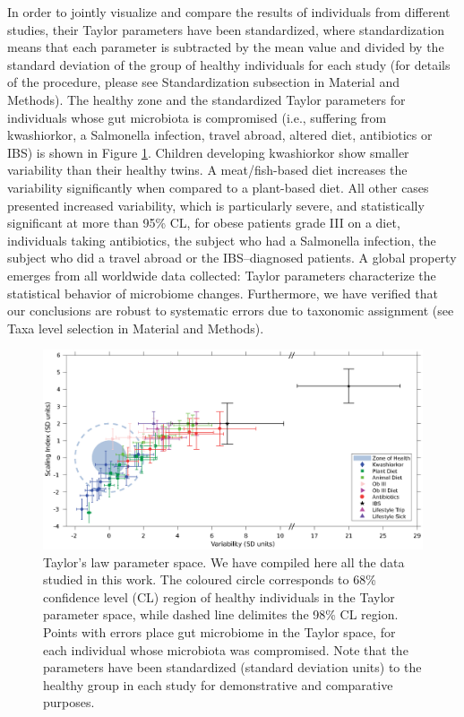 In order to jointly visualize and compare the results of individuals from different studies\cite{IBS,moving,antibiotic,LEA,kwashiorkor,diet,hostlife}, their Taylor parameters have been standardized, where standardization means that each parameter is subtracted by the mean value and divided by the standard deviation of the group of healthy individuals for each study (for details of the procedure, please see Standardization subsection in Material and Methods). The healthy zone and the standardized Taylor parameters for individuals whose gut microbiota is compromised (i.e., suffering from kwashiorkor, a Salmonella infection, travel abroad, altered diet, antibiotics or IBS) is shown in Figure \ref{fig:main2}. Children developing kwashiorkor show smaller variability than their healthy twins. A meat/fish-based diet increases the variability significantly when compared to a plant-based diet. All other cases presented increased variability, which is particularly severe, and statistically significant at more than 95\% CL, for obese patients grade III on a diet, individuals taking antibiotics, the subject who had a Salmonella infection, the subject who did a travel abroad or the IBS--diagnosed patients. A global property emerges from all worldwide data collected: Taylor parameters characterize the statistical behavior of microbiome changes. Furthermore, we have verified that our conclusions are robust to systematic errors due to taxonomic assignment (see Taxa level selection in Material and Methods).

\begin{figure}
	\centering
	\includegraphics[width=1.0\textwidth]{figs/Fig2.eps}
	\caption{Taylor's law parameter space. We have compiled here all the data studied in this work. The coloured circle corresponds to 68\% confidence level (CL) region of healthy individuals in the Taylor parameter space, while dashed line delimites the 98\% CL region. Points with errors place gut microbiome in the Taylor space, for each individual whose microbiota was compromised. Note that the parameters have been standardized (standard deviation units) to the healthy group in each study for demonstrative and comparative purposes.}
	\label{fig:main2}
\end{figure}

